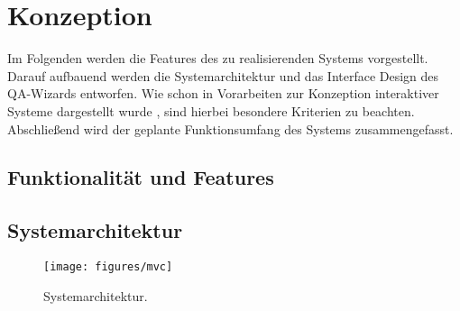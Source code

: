 \documentclass[12pt,        %
  english,ngerman,          %
  paper=a4,                 %
  captions=tablesignature,  %
  listof=numbered,          %
  bibliography=totoc,       %
  headings=small,           %
  headinclude=false,        %
  footinclude=false,        %
  parskip=half-,            %
  oneside,                  %
  BCOR=5mm,                 %
  DIV=12                    %
  ]{scrbook}                %
\begin{document}
\chapter{Konzeption}\label{chapter:concept}


Im Folgenden werden die Features des zu realisierenden Systems vorgestellt. Darauf aufbauend werden die Systemarchitektur und das Interface Design des QA-Wizards entworfen. Wie schon in Vorarbeiten zur Konzeption interaktiver Systeme dargestellt wurde \citep{herczeg-2009-software_ergonomie}, sind hierbei besondere Kriterien zu beachten. Abschließend wird der geplante Funktionsumfang des Systems zusammengefasst.

\section{Funktionalität und Features}\label{sec:concept_features}


\section{Systemarchitektur}\label{sec:concept_architecture}


\begin{figure}[htb]
  \begin{center}
    \texttt{[image: figures/mvc]}
  \end{center}
  \caption{Systemarchitektur.}
  \label{fig:mvc}
\end{figure}
\end{document}

